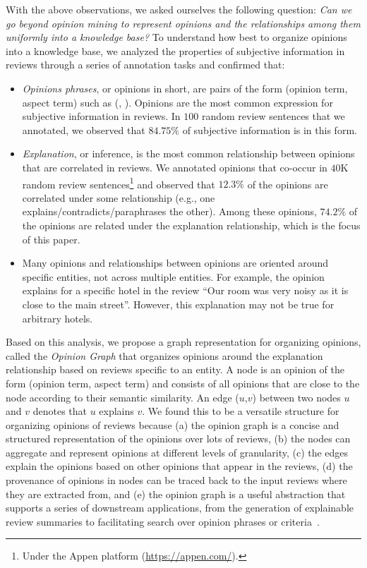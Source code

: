 With the above observations, we asked ourselves the following question:
\textit{Can we go beyond opinion mining to represent opinions and the relationships among them uniformly into a knowledge base?}
To understand how best to organize opinions into a knowledge base, we analyzed the properties of subjective information in reviews through a series of annotation tasks and confirmed that:
\begin{itemize}%
    \item {\em Opinions phrases}, or opinions in short, are pairs of the form (opinion term, aspect term) such as (, ). Opinions are the most common expression for subjective information in reviews. In $100$ random review sentences that we annotated, we observed that $84.75\%$ of subjective information is in this form. 
    \item {\em Explanation}, or inference, is the most common relationship between opinions that are correlated in reviews.
    We annotated opinions that co-occur in $40$K random review sentences\footnote{Under the Appen platform (\url{https://appen.com/}).} and observed that $12.3\%$ of the opinions are correlated under some relationship (e.g., one explains/contradicts/paraphrases the other). Among these opinions, $74.2\%$ of the opinions are related under the explanation relationship, which is the focus of this paper.
    \item Many opinions and relationships between opinions are oriented around specific entities, not across multiple entities.
    For example, the opinion  explains  for a specific hotel in the review ``Our room was very noisy as it is close to the main street''. However, this explanation may not be true for arbitrary hotels.
\end{itemize}




Based on this analysis, we propose a graph representation for organizing opinions, called the \textsl{Opinion Graph} that organizes opinions around the explanation relationship based on reviews specific to an entity.
A node is an opinion of
the form (opinion term, aspect term) and consists of all opinions that are close to the node according to their semantic similarity. An edge ($u$,$v$) between two nodes $u$ and $v$ denotes that $u$ explains $v$. 
We found this to be a versatile structure for organizing opinions of reviews because (a) the opinion graph is a concise and structured representation of the opinions over lots of reviews, 
(b) the nodes can aggregate and represent opinions at different levels of granularity, (c) the edges explain the opinions based on other opinions that appear in the reviews, (d) the provenance of opinions in nodes can be traced back to the input reviews where they are extracted from, and (e) the opinion graph is a useful abstraction that supports a series of downstream applications, from the generation of explainable review summaries to facilitating search over opinion phrases or criteria~\cite{Li:2019:Opine}. 

